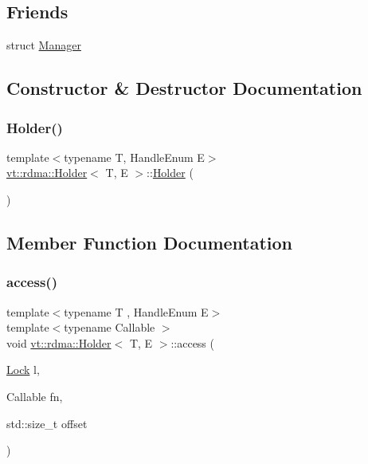\subsection*{Friends}
\begin{DoxyCompactItemize}
\item 
struct \hyperlink{structvt_1_1rdma_1_1_holder_a1fd6b9bc3f72bb2b64e602de3982929d}{Manager}
\end{DoxyCompactItemize}


\subsection{Constructor \& Destructor Documentation}
\mbox{\label{structvt_1_1rdma_1_1_holder_aa0d947b72bd66a1a0507062f3dffd590}} 
\subsubsection{\texorpdfstring{Holder()}{Holder()}}
{\footnotesize\ttfamily template$<$typename T, Handle\+Enum E$>$ \\
\hyperlink{structvt_1_1rdma_1_1_holder}{vt\+::rdma\+::\+Holder}$<$ T, E $>$\+::\hyperlink{structvt_1_1rdma_1_1_holder}{Holder} (\begin{DoxyParamCaption}{ }\end{DoxyParamCaption})\hspace{0.3cm}{\ttfamily [default]}}



\subsection{Member Function Documentation}
\mbox{\label{structvt_1_1rdma_1_1_holder_a352b9ae14f0f60cee7df78231d2debfe}} 
\subsubsection{\texorpdfstring{access()}{access()}}
{\footnotesize\ttfamily template$<$typename T , Handle\+Enum E$>$ \\
template$<$typename Callable $>$ \\
void \hyperlink{structvt_1_1rdma_1_1_holder}{vt\+::rdma\+::\+Holder}$<$ T, E $>$\+::access (\begin{DoxyParamCaption}\item[{\hyperlink{namespacevt_1_1rdma_ac5c20b41a653e520b6305d4d454ecb70}{Lock}}]{l,  }\item[{Callable}]{fn,  }\item[{std\+::size\+\_\+t}]{offset }\end{DoxyParamCaption})}


